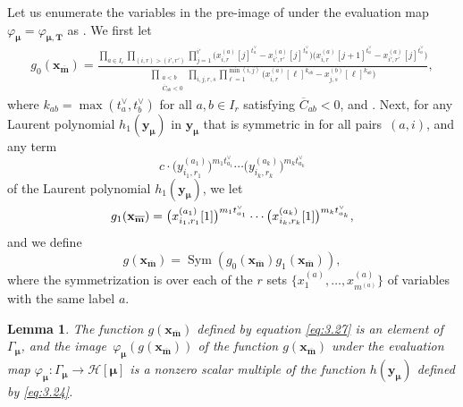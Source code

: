 \documentclass[10pt,a4paper]{amsart}
\numberwithin{equation}{section}
\newtheorem{Lemma}[Theorem]{Lemma}
\DeclareMathOperator{\Sym}{Sym}
\begin{document}
Let us enumerate the variables in the pre-image of  under the evaluation map $\varphi_{\bm{\mu}}= \varphi_{\bm{\mu},\mathbf{T}}$ as . We first let
\begin{gather}\label{eq:3.25}
g_0(\mathbf{x}_{\overline{\mathbf{m}}})
=\frac{\prod_{a\in I_r}\prod_{(i,r)>(i',r')} \prod_{j=1}^{i'}\bigl(x_{i,r}^{(a)}[j]^{t_a^{\vee}}-x_{i',r'}^{(a)}[j]^{t_a^{\vee}}\bigr)\!\bigl(x_{i,r}^{(a)}[j+1]^{t_a^{\vee}}-x_{i',r'}^{(a)}[j]^{t_a^{\vee}}\bigr)}{ \prod_{\substack{a<b\\\overline{C}_{ab}<0}}\prod_{i,j,r,s} \prod_{\ell=1}^{\min(i,j)}\bigl(x_{i,r}^{(a)}[\ell]^{k_{ab}}-x_{j,s}^{(b)}[\ell]^{k_{ab}}\bigr)},\!\!\!
\end{gather}
where $k_{ab}=\max(t_a^{\vee},t_b^{\vee})$ for all $a,b\in I_r$ satisfying $\overline{C}_{ab}<0$, and . Next, for any Laurent polynomial $h_1(\mathbf{y}_{\bm{\mu}})$ in $\mathbf{y}_{\bm{\mu}}$ that is symmetric in  for all pairs~$(a,i)$, and any term
\[
c\cdot \bigl(y_{i_1,r_1}^{(a_1)}\bigr)^{m_1t_{a_1}^{\vee}}\cdots\bigl(y_{i_k,r_k}^{(a_k)}\bigr)^{m_kt_{a_k}^{\vee}}
\] of the Laurent polynomial $h_1(\mathbf{y}_{\bm{\mu}})$, we let
\[
g_1(\mathbf{x}_{\overline{\mathbf{m}}})
=\smash{\bigl(x_{i_1,r_1}^{(a_1)}[1]\bigr)^{m_1t_{a_1}^{\vee}}\cdots \bigl(x_{i_k,r_k}^{(a_k)}[1]\bigr)^{m_kt_{a_k}^{\vee}}},
\]
and we define
\begin{equation}\label{eq:3.27}
g(\mathbf{x}_{\overline{\mathbf{m}}})
=\Sym(g_0(\mathbf{x}_{\overline{\mathbf{m}}})g_1(\mathbf{x}_{\overline{\mathbf{m}}})),
\end{equation}
where the symmetrization is over each of the $r$ sets $\bigl\{ x_1^{(a)},\dots,x_{m^{(a)}}^{(a)}\bigr\}$ of
variables with the same label $a$.

\begin{Lemma}\label{3.7}
The function $g(\mathbf{x}_{\overline{\mathbf{m}}})$ defined by equation \eqref{eq:3.27} is an element of $\Gamma_{\bm{\mu}}$, and the image~$\varphi_{\bm{\mu}}(g(\mathbf{x}_{\overline{ \mathbf{m}}}))$ of the function $g(\mathbf{x}_{\overline{ \mathbf{m}}})$ under the evaluation map $\varphi_{\bm{\mu}}\colon \Gamma_{\bm{\mu}}\to\mathcal{H}[\bm{\mu}]$ is a nonzero scalar multiple of the function $h(\mathbf{y}_{\bm{\mu}})$ defined by \eqref{eq:3.24}.
\end{Lemma}
\end{document}
